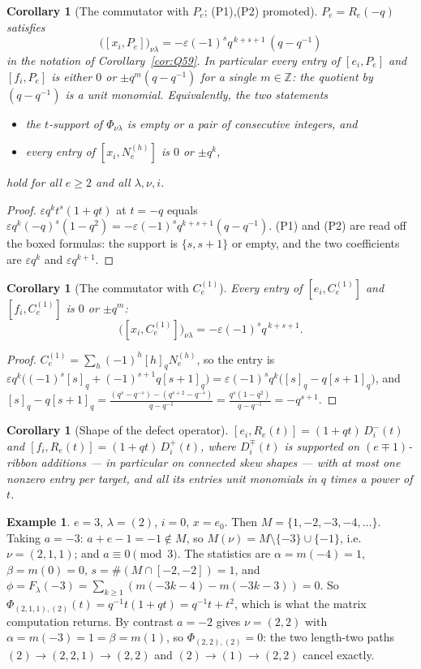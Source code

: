 \documentclass[11pt]{article}
\theoremstyle{plain}
\newtheorem{corollary}[theorem]{Corollary}
\theoremstyle{definition}
\newtheorem{example}[theorem]{Example}
\newcommand{\Z}{\mathbb{Z}}
\begin{document}
\begin{corollary}[The commutator with $P_e$; (P1),(P2) promoted]\label{cor:P}
$P_e=R_e(-q)$ satisfies
\[
\big([x_i,P_e]\big)_{\nu\lambda}=-\varepsilon(-1)^s q^{\,k+s+1}\,(q-q^{-1})
\]
in the notation of Corollary~\ref{cor:Q59}. In particular every entry of
$[e_i,P_e]$ and $[f_i,P_e]$ is either $0$ or $\pm q^m(q-q^{-1})$ for a single
$m\in\Z$: the quotient by $(q-q^{-1})$ is a \emph{unit monomial}. Equivalently, the
two statements
\begin{itemize}
\item[\rm(P1)] the $t$-support of $\Phi_{\nu\lambda}$ is empty or a pair of
consecutive integers, and
\item[\rm(P2)] every entry of $[x_i,N_e^{(h)}]$ is $0$ or $\pm q^k$,
\end{itemize}
hold for all $e\ge2$ and all $\lambda,\nu,i$.
\end{corollary}
\begin{proof}
$\varepsilon q^kt^s(1+qt)$ at $t=-q$ equals
$\varepsilon q^k(-q)^s(1-q^2)=-\varepsilon(-1)^sq^{k+s+1}(q-q^{-1})$. (P1) and (P2)
are read off the boxed formulas: the support is $\{s,s+1\}$ or empty, and the two
coefficients are $\varepsilon q^k$ and $\varepsilon q^{k+1}$.
\end{proof}

\begin{corollary}[The commutator with $C^{(1)}_e$]
Every entry of $[e_i,C^{(1)}_e]$ and $[f_i,C^{(1)}_e]$ is $0$ or $\pm q^m$:
\[
\big([x_i,C^{(1)}_e]\big)_{\nu\lambda}=-\varepsilon(-1)^s q^{\,k+s+1}.
\]
\end{corollary}
\begin{proof}
$C^{(1)}_e=\sum_h(-1)^h[h]_qN_e^{(h)}$, so the entry is
$\varepsilon q^k\big((-1)^s[s]_q+(-1)^{s+1}q[s+1]_q\big)
=\varepsilon(-1)^sq^k\big([s]_q-q[s+1]_q\big)$, and
$[s]_q-q[s+1]_q=\frac{(q^s-q^{-s})-(q^{s+2}-q^{-s})}{q-q^{-1}}
=\frac{q^s(1-q^2)}{q-q^{-1}}=-q^{s+1}$.
\end{proof}

\begin{corollary}[Shape of the defect operator]
$[e_i,R_e(t)]=(1+qt)\,D_i^-(t)$ and $[f_i,R_e(t)]=(1+qt)\,D_i^+(t)$, where
$D_i^\mp(t)$ is supported on $(e\mp1)$-ribbon additions --- in particular on
\emph{connected} skew shapes --- with at most one nonzero entry per target, and
all its entries unit monomials in $q$ times a power of $t$.
\end{corollary}

\begin{example}
$e=3$, $\lambda=(2)$, $i=0$, $x=e_0$. Then $M=\{1,-2,-3,-4,\dots\}$. Taking
$a=-3$: $a+e-1=-1\notin M$, so $M(\nu)=M\setminus\{-3\}\cup\{-1\}$, i.e.\
$\nu=(2,1,1)$; and $a\equiv0\pmod3$. The statistics are
$\alpha=m(-4)=1$, $\beta=m(0)=0$, $s=\#(M\cap[-2,-2])=1$, and
$\phi=F_\lambda(-3)=\sum_{k\ge1}(m(-3k-4)-m(-3k-3))=0$. So
$\Phi_{(2,1,1),(2)}(t)=q^{-1}t(1+qt)=q^{-1}t+t^2$, which is what the matrix
computation returns. By contrast $a=-2$ gives $\nu=(2,2)$ with
$\alpha=m(-3)=1=\beta=m(1)$, so $\Phi_{(2,2),(2)}=0$: the two length-two paths
$(2)\to(2,2,1)\to(2,2)$ and $(2)\to(1)\to(2,2)$ cancel exactly.
\end{example}
\end{document}
